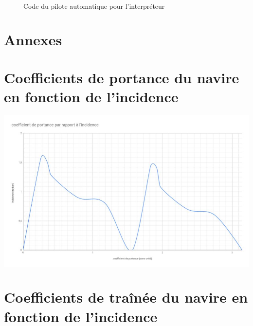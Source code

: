 \documentclass[a4paper,11pt]{article}
\begin{document}
    \begin{figure}[H]
        \begin{center}
            \caption{Code du pilote automatique pour l’interpréteur}
            
            \label{fig:codeAutoPilot}
        \end{center}
    \end{figure}

    \newpage
    \section*{Annexes}

    \begin{appendix}

        \section{Coefficients de portance du navire en fonction de l'incidence}

        \begin{center}
            \includegraphics[scale=0.7, angle=90]{assets/Titanic_Cz.jpg}
        \end{center}

        \section{Coefficients de traînée du navire en fonction de l'incidence}


\end{appendix}
\end{document}
